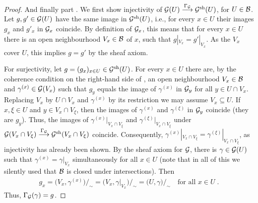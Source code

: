 \documentclass[a4paper,parskip=half,numbers=enddot, DIV=12]{scrreprt}
\begin{document}
\begin{proof}
	And finally part . We first show injectivity of $\Gg(U)\morphism[\Gamma_\Gg] \Gg^\sh(U)$, for $U\in \mathcal{B}$. Let $g,g'\in \mathcal{G}(U)$ have the same image in $\mathcal{G}^{\mathrm{sh}}(U)$, i.e., for every $x\in U$ their images $g_x$ and $g'_x$ in $\mathcal{G}_x$ coincide. By definition of $\mathcal{G}_x$, this means that for every $x\in U$ there is an open neighbourhood $V_x\in\mathcal{B}$ of $x$, such that $g|_{V_x}=g'|_{V_x}$. As the $V_x$ cover $U$, this implies $g=g'$ by the sheaf axiom.
	
	For surjectivity, let $g=(g_x)_{x\in U}\in \mathcal{G}^{\mathrm{sh}}(U)$. For every $x\in U$ there are, by the coherence condition on the right-hand side of , an open neighbourhood $V_x\in\mathcal{B}$ and $\gamma^{(x)}\in \mathcal{G}(V_x)$ such that $g_y$ equals the image of $\gamma^{(x)}$ in $\mathcal{G}_y$ for all $y\in U\cap V_x$. Replacing $V_x$ by $U\cap V_x$ and $\gamma^{(x)}$ by its restriction we may assume $V_x\subseteq U$. If $x,\xi\in U$ and $y\in V_x\cap V_\xi$, then the images of $\gamma^{(x)}$ and $\gamma^{(\xi)}$ in $\mathcal{G}_y$ coincide (they are $g_y$). Thus, the images of $\gamma^{(x)}|_{V_x\cap V_\xi}$ and $ \gamma^{(\xi)}|_{V_x\cap V_\xi}$ under $\Gg(V_x\cap V_\xi ) \morphism[\Gamma_\Gg] \Gg^\sh(V_x\cap V_\xi)$ coincide. Consequently,  $\gamma^{(x)}|_{V_x\cap V_\xi} = \gamma^{(\xi)}|_{V_x\cap V_\xi}$, as injectivity has already been shown. By the sheaf axiom for $\mathcal{G}$, there is $\gamma\in \mathcal{G}(U)$ such that $\gamma^{(x)}=\gamma|_{V_x}$ simultaneously for all $x\in U$ (note that in all of this we silently used that $\mathcal{B}$ is closed under intersections). Then 
	\begin{align*}
		g_x=\big(V_x, \gamma^{(x)}\big)/_\sim = \big(V_x,\gamma|_{V_x}\big)/_\sim = \big(U,\gamma\big)/_\sim\quad\text{for all }x\in U\;. 
	\end{align*}
	Thus, $\Gamma_{\mathcal{G}}(\gamma) = g$.
\end{proof}
\end{document}
